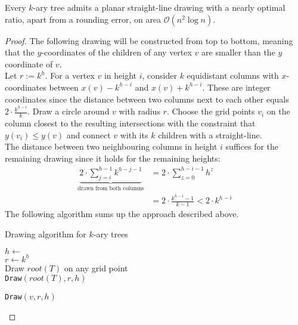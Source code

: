 \begin{theorem}
	Every $k$-ary tree admits a planar straight-line drawing with a nearly optimal ratio, apart from a rounding error, on area $\mathcal{O}(n^2\log n)$.
\end{theorem}
\begin{proof}
	The following drawing will be constructed from top to bottom, meaning that the $y$-coordinates of the children of any vertex $v$ are smaller than the $y$ coordinate of $v$.\\
	Let $r := k^h$. For a vertex $v$ in height $i$, consider $k$ equidistant columns with $x$-coordinates between $x(v) - k^{h-i}$ and $x(v) + k^{h-i}$. These are integer coordinates since the distance between two columns next to each other equals $2\cdot \frac{k^{h-i}}{k}$. Draw a circle around $v$ with radius $r$. Choose the grid points $v_i$ on the column closest to the resulting intersections with the constraint that $y(v_i) \leq y(v)$ and connect $v$ with its $k$ children with a straight-line.
	\\
	The distance between two neighbouring columns in height $i$ suffices for the remaining drawing since it holds for the remaining heights:
	\begin{align}
		\underbrace{2\cdot \sum_{j=i}^{h-1} k^{h-j-1}}_{\text{drawn from both columns}} &= 2\cdot\sum_{z = 0}^{h-i-1}h^z\\
		&= 2\cdot\frac{k^{h-i}-1}{k-1} < 2\cdot k^{h-i}
	\end{align}
	The following algorithm sums up the approach described above.\\
	\begin{algorithm}[H]
		\caption{Drawing algorithm for $k$-ary trees}
		$h \gets $ \\
		$r \gets k^h$\\
		Draw $root(T)$ on any grid point\\
		\texttt{Draw}$(root(T),r,h)$
	\end{algorithm}
	\begin{algorithm}[H]
		\caption{\texttt{Draw}$(v,r,h)$}
\end{algorithm}
\end{proof}
